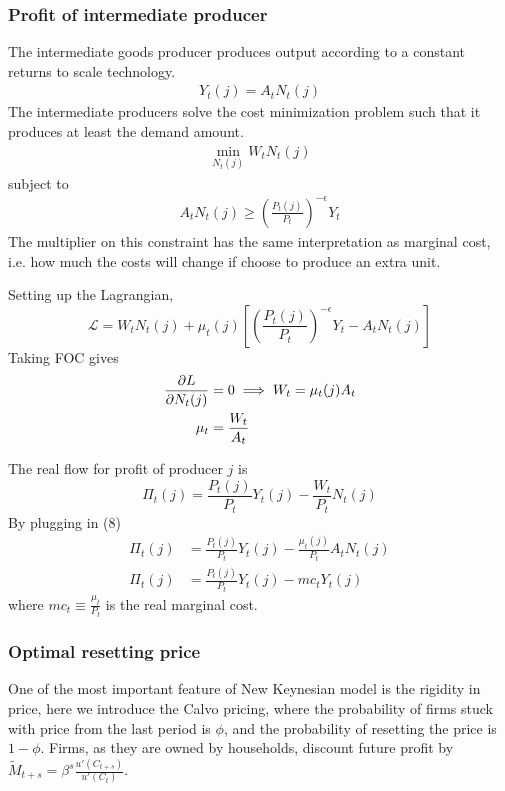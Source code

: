 \documentclass[twocolumn, fleqn]{article}
\begin{document}
	\subsubsection{Profit of intermediate producer}
	The intermediate goods producer produces output according to a constant returns to scale technology.
	\begin{align}
		Y_t(j) = A_t N_t(j)
	\end{align}
	The intermediate producers solve the cost minimization problem such  that it produces at least the demand amount.
	\begin{align*}
		\min_{N_t(j)} W_t N_t(j)
	\end{align*}
	subject to 
	\begin{align*}
		A_t N_t(j) \geq \left( \frac{P_t(j)}{P_t} \right)^{-\epsilon} Y_t
	\end{align*}
	The multiplier on this constraint has the same interpretation as marginal cost, i.e. how much the costs will change if choose to  produce an extra unit. 
	
	Setting up the Lagrangian, 
	\[\mathcal L = W_t N_t(j) + \mu_t(j)\left[\left(\frac{P_t(j)}{P_t} \right)^{-\epsilon} Y_t-A_t N_t(j)\right]\]
	Taking FOC gives
	\begin{align}
		\frac{\partial L}{\partial N_t(j)}&=0 \implies W_t =\mu_t(j) A_t \notag\\
		\mu_t &= \frac{W_t}{A_t}
	\end{align}
	
	The real flow for profit of producer $j$ is 
	\[\Pi_t(j) = \frac{P_t(j)}{P_t}Y_t(j) - \frac{W_t}{P_t}N_t(j)\]
	By plugging in (8)
	\begin{align*}
		\Pi_t(j) &= \frac{P_t(j)}{P_t}Y_t(j) - \frac{\mu_t(j)}{P_t}A_t N_t(j)\\
		\Pi_t(j) &= \frac{P_t(j)}{P_t}Y_t(j) - mc_t Y_t(j)
		\end{align*}
	where $mc_t \equiv \frac{\mu_t}{P_t}$ is the real marginal cost.
	
	\subsubsection{Optimal resetting price}
	One of the most important feature of New Keynesian model is the rigidity in price, here we introduce the Calvo pricing, where the probability of firms stuck with price from the last period is $\phi$, and the probability of resetting the price is $1-\phi$. Firms, as they are owned by households, discount future profit by $\tilde{M}_{t+s} = \beta^s \frac{u'(C_{t+s})}{u'(C_{t})}$.
	
\end{document}
